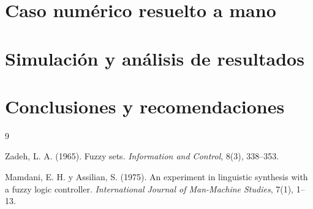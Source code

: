 \documentclass[11pt]{article}
\begin{document}
\section{Caso numérico resuelto a mano}

\section{Simulación y análisis de resultados}

\section{Conclusiones y recomendaciones}

\begin{thebibliography}{9}

Zadeh, L. A. (1965). Fuzzy sets. \emph{Information and Control}, 8(3), 338--353.

Mamdani, E. H. y Assilian, S. (1975). An experiment in linguistic synthesis with a fuzzy logic controller. \emph{International Journal of Man-Machine Studies}, 7(1), 1--13.

\end{thebibliography}
\end{document}
